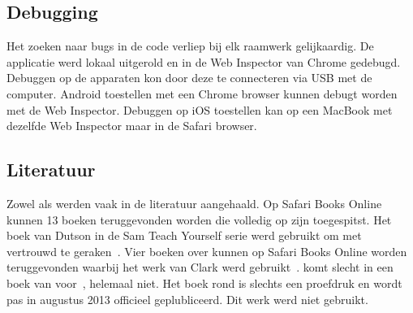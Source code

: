 
\subsection{Debugging}
Het zoeken naar bugs in de code verliep bij elk raamwerk gelijkaardig.
De applicatie werd lokaal uitgerold en in de Web Inspector van Chrome gedebugd.
Debuggen op de apparaten kon door deze te connecteren via USB met de computer.
Android toestellen met een Chrome browser kunnen debugt worden met de Web Inspector.
Debuggen op iOS toestellen kan op een MacBook met dezelfde Web Inspector maar in de Safari browser. %

\subsection{Literatuur}
Zowel \jqm{} als \st{} werden vaak in de literatuur aangehaald.
Op Safari Books Online kunnen 13 boeken teruggevonden worden die volledig op \jqm{} zijn toegespitst.
Het boek van Dutson in de Sam Teach Yourself serie werd gebruikt om met \jqm{} vertrouwd te geraken~\cite{PhilDutson2012}.
Vier boeken over \st{} kunnen op Safari Books Online worden teruggevonden waarbij het werk van Clark werd gebruikt~\cite{JohnEClark2012}.
\kendo{} komt slecht in een boek van voor~\cite{Bhandari2013},  \lungo{} helemaal niet.
Het boek rond \kendo{} is slechts een proefdruk en wordt pas in augustus 2013 officieel geplubliceerd.
Dit werk werd niet gebruikt.


